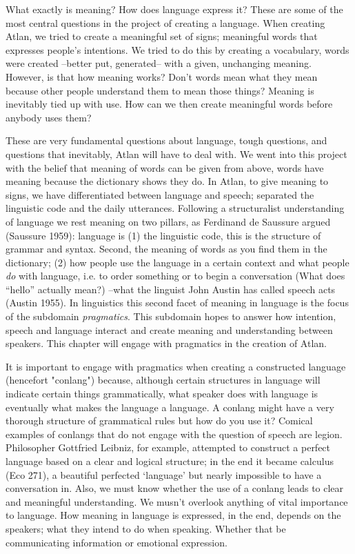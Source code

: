 What exactly is meaning? How does language express it? These are some of the most central questions in the project of creating a language. When creating Atlan, we tried to create a meaningful set of signs; meaningful words that expresses people's intentions. We tried to do this by creating a vocabulary, words were created --better put, generated-- with a given, unchanging meaning. However, is that how meaning works? Don't words mean what they mean because other people understand them to mean those things? Meaning is inevitably tied up with use. How can we then create meaningful words before anybody uses them? 

These are very fundamental questions about language, tough questions, and questions that inevitably, Atlan will have to deal with. We went into this project with the belief that meaning of words can be given from above, words have meaning because the dictionary shows they do. In Atlan, to give meaning to signs, we have differentiated between language and speech; separated the linguistic code and the daily utterances. Following a structuralist understanding of language we rest meaning on two pillars, as Ferdinand de Saussure argued (Saussure 1959): language is (1) the linguistic code, this is the structure of grammar and syntax. Second, the meaning of words as you find them in the dictionary; (2) how people use the language in a certain context and what people \textit{do} with language, i.e. to order something or to begin a conversation (What does “hello” actually mean?) --what the linguist John Austin has called speech acts (Austin 1955). In linguistics this second facet of meaning in language is the focus of the subdomain {\it pragmatics}. This subdomain hopes to answer how intention, speech and language interact and create meaning and understanding between speakers. This chapter will engage with pragmatics in the creation of Atlan. 

It is important to engage with pragmatics when creating a constructed language (hencefort "conlang") because, although certain structures in language will indicate certain things grammatically, what speaker does with language is eventually what makes the language a language. A conlang might have a very thorough structure of grammatical rules but how do you use it? Comical examples of conlangs that do not engage with the question of speech are legion. Philosopher Gottfried Leibniz, for example, attempted to construct a perfect language based on a clear and logical structure; in the end it became calculus (Eco 271), a beautiful perfected ‘language’ but nearly impossible to have a conversation in. Also, we must know whether the use of a conlang leads to clear and meaningful understanding. We musn't overlook anything of vital importance to language. How meaning in language is expressed, in the end, depends on the speakers; what they intend to do when speaking. Whether that be communicating information or emotional expression.  

